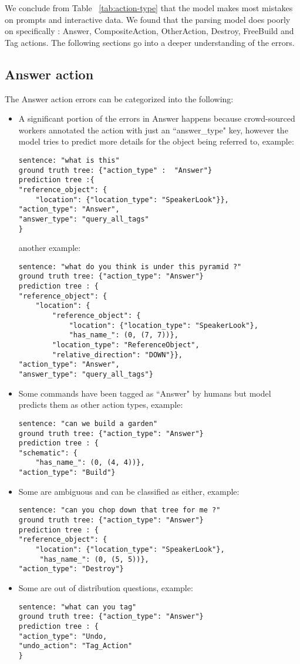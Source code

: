 We conclude from Table ~\ref{tab:action-type} that the model makes most mistakes on prompts and interactive data. We found that the parsing model does poorly on specifically : Answer, CompositeAction, OtherAction, Destroy, FreeBuild and Tag actions. The following sections go into a deeper understanding of the errors.

\subsection{Answer action}
The Answer action errors can be categorized into the following:
\begin{itemize}
\item A significant portion of the errors in Answer happens because crowd-sourced workers annotated the action with just an ``answer\_type" key, however the model tries to predict more details for the object being referred to, example:
\begin{verbatim}
sentence: "what is this" 
ground truth tree: {"action_type" :  "Answer"}
prediction tree :{
"reference_object": {
    "location": {"location_type": "SpeakerLook"}}, 
"action_type": "Answer", 
"answer_type": "query_all_tags"
}
\end{verbatim}
another example:
\begin{verbatim}
sentence: "what do you think is under this pyramid ?"
ground truth tree: {"action_type": "Answer"}
prediction tree : {
"reference_object": {
    "location": {
	    "reference_object": {
		    "location": {"location_type": "SpeakerLook"}, 
		    "has_name_": (0, (7, 7))}, 
        "location_type": "ReferenceObject",
        "relative_direction": "DOWN"}}, 
"action_type": "Answer", 
"answer_type": "query_all_tags"}
\end{verbatim}

\item Some commands have been tagged as ``Answer" by humans but model predicts them as other action types, example:
\begin{verbatim}
sentence: "can we build a garden"
ground truth tree: {"action_type": "Answer"}
prediction tree : {
"schematic": {
    "has_name_": (0, (4, 4))}, 
"action_type": "Build"}
\end{verbatim}

\item Some are ambiguous and can be classified as either, example:
\begin{verbatim}
sentence: "can you chop down that tree for me ?"
ground truth tree: {"action_type": "Answer"}
prediction tree : {
"reference_object": {
    "location": {"location_type": "SpeakerLook"},
     "has_name_": (0, (5, 5))}, 
"action_type": "Destroy"}
\end{verbatim}

\item Some are out of distribution questions, example:
\begin{verbatim}
sentence: "what can you tag"
ground truth tree: {"action_type": "Answer"}
prediction tree : {
"action_type": "Undo, 
"undo_action": "Tag_Action"
}
\end{verbatim}
\end{itemize}


